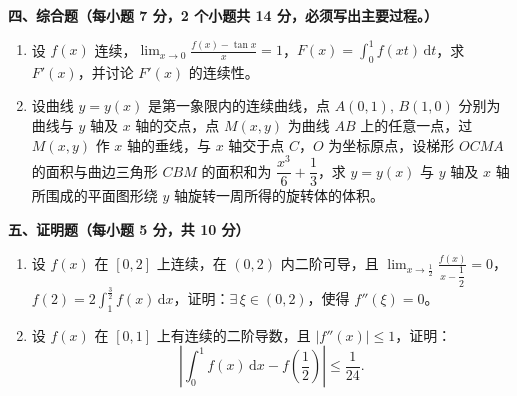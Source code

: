 \documentclass[a4paper,11pt]{ctexart}
\newcommand{\dd}{\,\mathrm{d}}
\begin{document}
\vspace{0.35em}

\textbf{四、综合题（每小题 7 分，2 个小题共 14 分，必须写出主要过程。）}

\begin{enumerate}[label=\arabic*., start=17, leftmargin=2em, itemsep=0.4em, topsep=0.3em]
  \item 设 $f(x)$ 连续，$\displaystyle\lim_{x\to 0}\frac{f(x)-\tan x}{x}=1$，$F(x)=\displaystyle\int_0^1 f(xt)\dd t$，求 $F'(x)$，并讨论 $F'(x)$ 的连续性。

  \item 设曲线 $y=y(x)$ 是第一象限内的连续曲线，点 $A(0,1),\,B(1,0)$ 分别为曲线与 $y$ 轴及 $x$ 轴的交点，点 $M(x,y)$ 为曲线 $AB$ 上的任意一点，过 $M(x,y)$ 作 $x$ 轴的垂线，与 $x$ 轴交于点 $C$，$O$ 为坐标原点，设梯形 $OCMA$ 的面积与曲边三角形 $CBM$ 的面积和为 $\dfrac{x^3}{6}+\dfrac{1}{3}$，求 $y=y(x)$ 与 $y$ 轴及 $x$ 轴所围成的平面图形绕 $y$ 轴旋转一周所得的旋转体的体积。
\end{enumerate}

\vspace{0.35em}

\textbf{五、证明题（每小题 5 分，共 10 分）}

\begin{enumerate}[label=\arabic*., start=19, leftmargin=2em, itemsep=0.4em, topsep=0.3em]
  \item 设 $f(x)$ 在 $[0,2]$ 上连续，在 $(0,2)$ 内二阶可导，且 $\displaystyle\lim_{x\to\frac{1}{2}}\frac{f(x)}{x-\dfrac{1}{2}}=0$，$f(2)=2\displaystyle\int_1^{\frac{3}{2}}f(x)\dd x$，证明：$\exists\,\xi\in(0,2)$，使得 $f''(\xi)=0$。

  \item 设 $f(x)$ 在 $[0,1]$ 上有连续的二阶导数，且 $|f''(x)|\le 1$，证明：
  \[
    \left|\int_0^1 f(x)\dd x - f\!\left(\frac{1}{2}\right)\right| \le \frac{1}{24}.
  \]
\end{enumerate}
\end{document}
